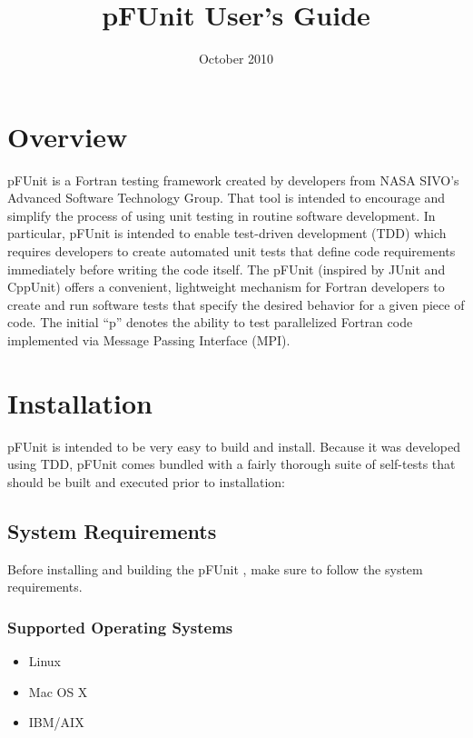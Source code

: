 \documentclass[10pt]{article}
\title{pFUnit User's Guide}
\author{}
\date{October 2010}                                           %
\newcommand{\pfunit}{{\sc pFUnit }}
\begin{document}
\maketitle

\newpage

\tableofcontents

\newpage

\section{Overview}
\pfunit is a Fortran testing framework created by developers from NASA
SIVO's Advanced Software Technology Group.  That tool is intended to
encourage and simplify the process of using unit testing in routine
software development.  In particular, \pfunit is intended to enable
test-driven development (TDD) which requires developers to create
automated unit tests that define code requirements immediately before
writing the code itself.  The \pfunit (inspired by JUnit and CppUnit)
offers a convenient, lightweight mechanism for Fortran developers to
create and run software tests that specify the desired behavior for a
given piece of code. The initial ``p'' denotes the ability to test
parallelized Fortran code implemented via Message Passing Interface (MPI).

\newpage

\section{Installation}

\pfunit is intended to be very easy to build and install.  Because it
was developed using TDD, \pfunit comes bundled with a fairly thorough
suite of self-tests that should be built and executed prior to installation:

\subsection{System Requirements}

Before installing and building the \pfunit, make sure to follow the system requirements.

\subsubsection{Supported Operating Systems}
\begin{itemize}
  \item Linux
  \item Mac OS X
  \item IBM/AIX
\end{itemize}
\end{document}
